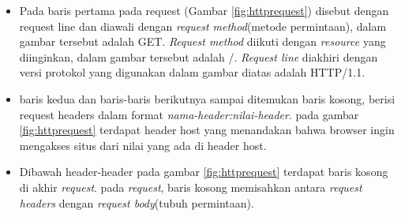 \begin{itemize}
	\item Pada baris pertama pada request (Gambar \ref{fig:httprequest}) disebut dengan request line dan diawali dengan \textit{request method}(metode permintaan), dalam gambar tersebut adalah GET. \textit{Request method} diikuti dengan \textit{resource} yang diinginkan, dalam gambar tersebut adalah /. \textit{Request line} diakhiri dengan versi protokol yang digunakan dalam gambar diatas adalah HTTP/1.1.
	\item baris kedua dan baris-baris berikutnya sampai ditemukan baris kosong, berisi request headers dalam format \textit{nama-header:nilai-header}. pada gambar \ref{fig:httprequest} terdapat header host yang menandakan bahwa browser ingin mengakses situs dari nilai yang ada di header host.
	\item Dibawah header-header pada gambar \ref{fig:httprequest} terdapat baris kosong di akhir \textit{request}. pada \textit{request}, baris kosong memisahkan antara \textit{request headers} dengan \textit{request body}(tubuh permintaan).
\end{itemize}

